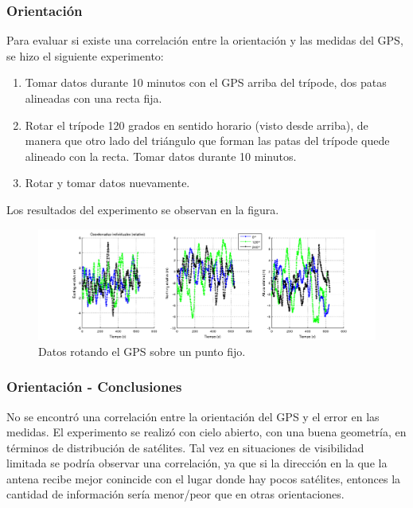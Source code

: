 \documentclass[spanish,12pt,a4paper,titlepage]{report}
\begin{document}
\newpage
\subsubsection{Orientación}
\label{sec:gps-orientacion}

Para evaluar si existe una correlación entre la orientación y las medidas del GPS, se hizo el siguiente experimento:
\begin{enumerate}
\item Tomar datos durante 10 minutos con el GPS arriba del trípode, dos patas alineadas con una recta fija.
\item Rotar el trípode 120 grados en sentido horario (visto desde arriba), de manera que otro lado del triángulo que forman las patas del trípode quede alineado con la recta. Tomar datos durante 10 minutos.
\item Rotar y tomar datos nuevamente.
\end{enumerate}

Los resultados del experimento se observan en la figura.

\begin{figure}[h!]
\hspace{-70pt}
  \includegraphics[width=1.4\textwidth]{./img/orientacion_individual.png}
  \caption{Datos rotando el GPS sobre un punto fijo.}
  \label{fig:orientacion_individual.png}
\end{figure}

\subsubsection{Orientación - Conclusiones}
\label{sec:orientacion-conclusiones}

No se encontró una correlación entre la orientación del GPS y el error en las medidas.
El experimento se realizó con cielo abierto, con una buena geometría, en términos de distribución de satélites. Tal vez en situaciones de visibilidad limitada se podría observar una correlación, ya que si la dirección en la que la antena recibe mejor conincide con el lugar donde hay pocos satélites, entonces la cantidad de información sería menor/peor que en otras orientaciones.
\end{document}
